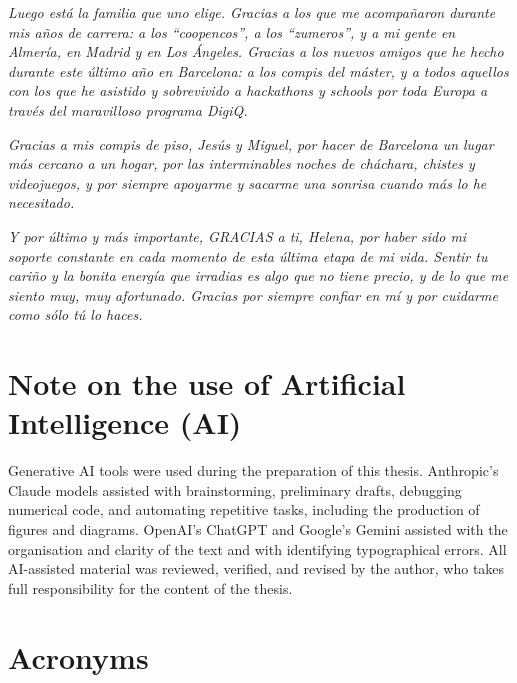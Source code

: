 \documentclass[a4paper,onecolumn,11pt,unpublished]{quantumarticle}
\begin{document}
\emph{Luego está la familia que uno elige. Gracias a los que me acompañaron durante mis años de carrera: a los ``coopencos'', a los ``zumeros'', y a mi gente en Almería, en Madrid y en Los Ángeles. Gracias a los nuevos amigos que he hecho durante este último año en Barcelona: a los compis del máster, y a todos aquellos con los que he asistido y sobrevivido a hackathons y schools por toda Europa a través del maravilloso programa DigiQ.}

\emph{Gracias a mis compis de piso, Jesús y Miguel, por hacer de Barcelona un lugar más cercano a un hogar, por las interminables noches de cháchara, chistes y videojuegos, y por siempre apoyarme y sacarme una sonrisa cuando más lo he necesitado.}

\emph{Y por último y más importante, GRACIAS a ti, Helena, por haber sido mi soporte constante en cada momento de esta última etapa de mi vida. Sentir tu cariño y la bonita energía que irradias es algo que no tiene precio, y de lo que me siento muy, muy afortunado. Gracias por siempre confiar en mí y por cuidarme como sólo tú lo haces.}



\vspace{2\baselineskip}

\section*{Note on the use of Artificial Intelligence (AI)}
Generative AI tools were used during the preparation of this thesis. Anthropic's Claude models assisted with brainstorming, preliminary drafts, debugging numerical code, and automating repetitive tasks, including the production of figures and diagrams. OpenAI's ChatGPT and Google's Gemini assisted with the organisation and clarity of the text and with identifying typographical errors. All AI-assisted material was reviewed, verified, and revised by the author, who takes full responsibility for the content of the thesis.

\clearpage

\tableofcontents

\clearpage

\FloatBarrier
\section*{Acronyms}
\begin{acronym}[DMRG]
\end{acronym}
\end{document}
